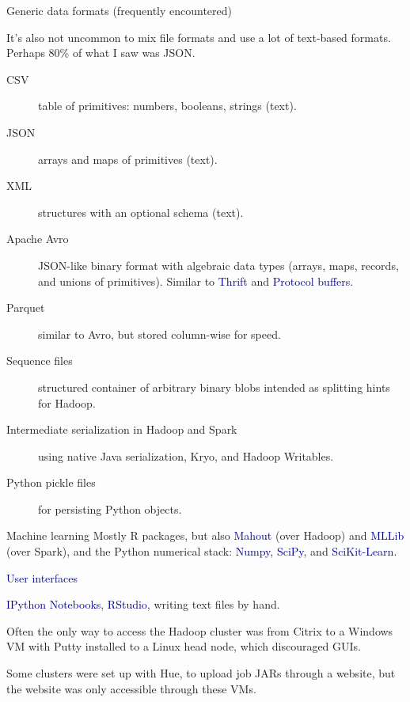 \documentclass{beamer}
\begin{document}
\begin{frame}{Generic data formats (frequently encountered)}

It's also not uncommon to mix file formats and use a lot of text-based formats. Perhaps 80\% of what I saw was JSON.

\begin{description}
\item[CSV] table of primitives: numbers, booleans, strings (text).
\item[JSON] arrays and maps of primitives (text).
\item[XML] structures with an optional schema (text).
\item[Apache Avro] JSON-like binary format with algebraic data types (arrays, maps, records, and unions of primitives). Similar to \textcolor{darkblue}{Thrift} and \textcolor{darkblue}{Protocol buffers}.
\item[Parquet] similar to Avro, but stored column-wise for speed.
\item[Sequence files] structured container of arbitrary binary blobs intended as splitting hints for Hadoop.
\item[Intermediate serialization in Hadoop and Spark] using native Java serialization, Kryo, and Hadoop Writables.
\item[Python pickle files] for persisting Python objects.
\end{description}
\end{frame}

\begin{frame}{Machine learning}
Mostly R packages, but also \textcolor{darkblue}{Mahout} (over Hadoop) and \textcolor{darkblue}{MLLib} (over Spark), and the Python numerical stack: \textcolor{darkblue}{Numpy}, \textcolor{darkblue}{SciPy}, and \textcolor{darkblue}{SciKit-Learn}.

\vfill
\hspace{-0.83 cm} \textcolor{darkblue}{\Large User interfaces}

\vspace{0.5 cm}
\textcolor{darkblue}{IPython Notebooks}, \textcolor{darkblue}{RStudio}, writing text files by hand.

\vspace{0.5 cm}
Often the only way to access the Hadoop cluster was from Citrix to a Windows VM with Putty installed to a Linux head node, which discouraged GUIs.

\vspace{0.5 cm}
Some clusters were set up with Hue, to upload job JARs through a website, but the website was only accessible through these VMs.
\end{frame}
\end{document}
